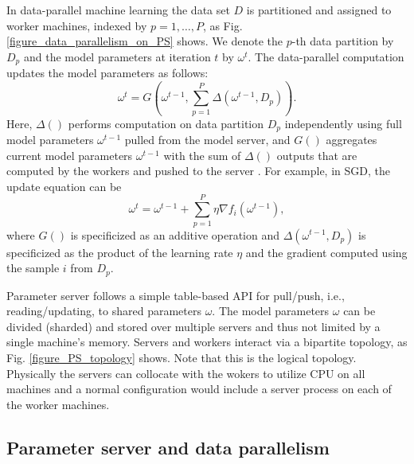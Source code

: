 \documentclass[preprint,review,11pt,a4paper]{elsarticle}
\begin{document}
In data-parallel machine learning the data set $D$ is partitioned and assigned to worker machines, indexed by $p=1, \ldots, P$, as Fig. \ref{figure_data_parallelism_on_PS} shows. We denote the $p$-th data partition by $D_p$ and the model parameters at iteration $t$ by $\omega^t$. The data-parallel computation updates the model parameters as follows:
\begin{equation}
\omega^t=G(\omega^{t-1}, \sum_{p=1}^P\Delta(\omega^{t-1}, D_p)).
\end{equation}
Here, $\Delta()$ performs computation on data partition $D_p$ independently using full model parameters $\omega^{t-1}$ pulled from the model server, and $G()$ aggregates current model parameters $\omega^{t-1}$ with the sum of $\Delta()$ outputs that are computed by the workers and pushed to the server\cite{ho2013more} \cite{xing2015petuum}.
For example, in SGD, the update equation can be
\begin{equation}
\omega^t=\omega^{t-1} + \sum_{p=1}^P\eta \nabla f_i(\omega^{t-1}),
\end{equation}
where $G()$ is specificized as an additive operation and $\Delta(\omega^{t-1}, D_p)$ is specificized as the product of the learning rate $\eta$ and the gradient computed using the sample $i$ from $D_p$.

Parameter server follows a simple table-based API for pull/push, i.e., reading/updating, to shared parameters $\omega$. 
The model parameters $\omega$ can be divided (sharded) and stored over multiple servers and thus not limited by a single machine's memory.
Servers and workers interact via a bipartite topology, as Fig. \ref{figure_PS_topology} shows. Note that this is the logical topology. Physically the servers can collocate with the wokers to utilize CPU on all machines and a normal configuration would include a server process on each of the worker machines. \cite{dai2015high} \cite{ho2013more}



\subsection{Parameter server and data parallelism}
\end{document}
